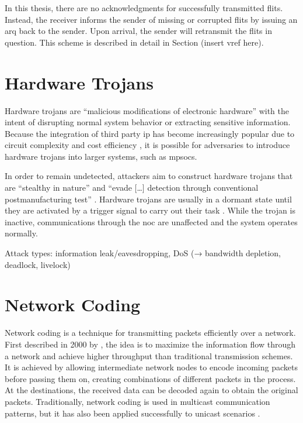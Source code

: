 In this thesis, there are no acknowledgments for successfully transmitted flits. Instead, the receiver informs the sender of missing or corrupted
flits by issuing an \gls{arq} back to the sender. Upon arrival, the sender will retransmit the flits in question. This scheme is described in detail
in Section (insert vref here).

\section{Hardware Trojans}\label{sec:hardwaretrojans}
Hardware trojans are \enquote{malicious modifications of electronic hardware} \cite[1]{bhunia14hardwaretrojans} with the intent of disrupting normal
system behavior or extracting sensitive information. Because the integration of third party \gls{ip} has become increasingly popular due to circuit
complexity and cost efficiency \cites[1]{ancajas14fortnocs}[2]{bhunia14hardwaretrojans}, it is possible for adversaries to introduce hardware
trojans into larger systems, such as \glspl{mpsoc}.

In order to remain undetected, attackers aim to construct hardware trojans that are \enquote{stealthy in nature} \cite[1]{bhunia14hardwaretrojans}
and \enquote{evade […] detection through conventional postmanufacturing test} \cite[1]{bhunia14hardwaretrojans}. Hardware trojans are usually in a
dormant state until they are activated by a trigger signal to carry out their task \cites{bhunia14hardwaretrojans}{ancajas14fortnocs}. While the
trojan is inactive, communications through the \gls{noc} are unaffected and the system operates normally.

Attack types: information leak/eavesdropping, DoS (→ bandwidth depletion, deadlock, livelock)

\section{Network Coding}\label{sec:networkcodingfun}
Network coding is a technique for transmitting packets efficiently over a network. First described in 2000 by \citeauthor{ahlswede00networkflow}
\cite{ahlswede00networkflow}, the idea is to maximize the information flow through a network and achieve higher throughput than traditional transmission
schemes. It is achieved by allowing intermediate network nodes to encode incoming packets before passing them on, creating combinations of different
packets in the process. At the destinations, the received data can be decoded again to obtain the original packets. Traditionally, network coding is
used in multicast communication patterns, but it has also been applied successfully to unicast scenarios \cite[e.g.][]{moriam15manycorenc}.

